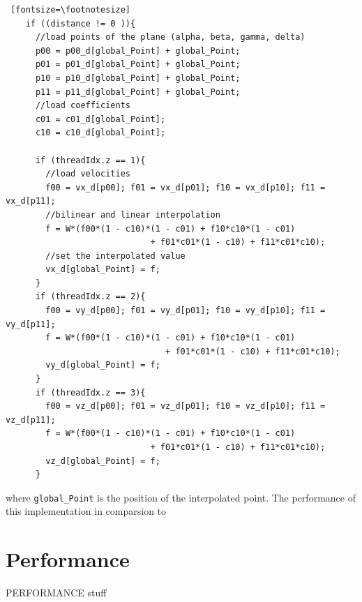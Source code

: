 \begin{Verbatim} [fontsize=\footnotesize]
    if ((distance != 0 )){
      //load points of the plane (alpha, beta, gamma, delta)
      p00 = p00_d[global_Point] + global_Point;
      p01 = p01_d[global_Point] + global_Point;
      p10 = p10_d[global_Point] + global_Point;
      p11 = p11_d[global_Point] + global_Point;
      //load coefficients
      c01 = c01_d[global_Point];
      c10 = c10_d[global_Point];

      if (threadIdx.z == 1){
        //load velocities
        f00 = vx_d[p00]; f01 = vx_d[p01]; f10 = vx_d[p10]; f11 = vx_d[p11];
        //bilinear and linear interpolation
        f = W*(f00*(1 - c10)*(1 - c01) + f10*c10*(1 - c01)
                             + f01*c01*(1 - c10) + f11*c01*c10);
        //set the interpolated value
        vx_d[global_Point] = f;
      }
      if (threadIdx.z == 2){
        f00 = vy_d[p00]; f01 = vy_d[p01]; f10 = vy_d[p10]; f11 = vy_d[p11];
        f = W*(f00*(1 - c10)*(1 - c01) + f10*c10*(1 - c01)
                                + f01*c01*(1 - c10) + f11*c01*c10);
        vy_d[global_Point] = f;
      }
      if (threadIdx.z == 3){
        f00 = vz_d[p00]; f01 = vz_d[p01]; f10 = vz_d[p10]; f11 = vz_d[p11];
        f = W*(f00*(1 - c10)*(1 - c01) + f10*c10*(1 - c01)
                             + f01*c01*(1 - c10) + f11*c01*c10);
        vz_d[global_Point] = f;
      }
\end{Verbatim}

where \texttt{global\_Point} is the position of the interpolated point.
The performance of this implementation in comparsion to

\clearpage

\section{Performance}
PERFORMANCE stuff
